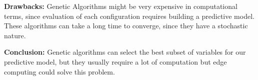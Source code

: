 \begin{poster}
{     \textbf{Drawbacks:}
        Genetic Algorithms might be very expensive in computational terms,
        since evaluation of each configuration requires building a predictive model.
        These algorithms can take a long time to converge, since they have a stochastic nature.

     \textbf{Conclusion:}
        Genetic algorithms can select the best subset of variables for our predictive model,
        but they usually require a lot of computation but edge computing could solve this problem.

}


\end{poster}